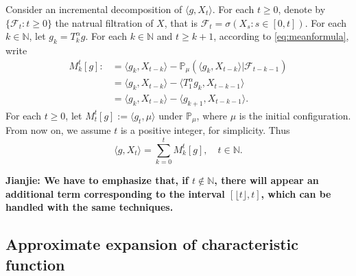 \documentclass[12pt, a4paper]{amsart}
\theoremstyle{definition}
\numberwithin{equation}{section}
\begin{document}
Consider an incremental decomposition of $\langle g,X_t \rangle$. 
    For each $t\geq 0$, denote by $\{\mathcal{F}_t:t\geq 0\}$ the natrual filtration of $X$, that is $\mathcal{F}_t=\sigma(X_s:s\in [0,t])$. 
    For each $k \in \mathbb{N}$, let $g_k=T^{\alpha}_k g$. 
    For each $k \in \mathbb N$ and $t\geq k+1$, according to \eqref{eq:meanformula}, write
\begin{align*}
    M_k^t[g]:&=\langle g_k, X_{t-k}\rangle-\mathbb{P}_{\mu}(\langle g_k,X_{t-k}\rangle|\mathcal{F}_{t-k-1})\\
    &=\langle g_k, X_{t-k}\rangle-\langle T_1^{\alpha}g_{k},X_{t-k-1}\rangle\\
    &=\langle g_k, X_{t-k}\rangle-\langle g_{k+1},X_{t-k-1}\rangle.
\end{align*}
    For each $t\geq 0$, let $M_t^t[g]:=\langle g_t,\mu\rangle$ under $\mathbb P_\mu$, where $\mu $ is the initial configuration. 
    From now on, we assume $t$ is a positive integer, for simplicity. Thus
\begin{equation}\label{decomposition}
    \langle g,X_t\rangle
    =\sum_{k=0}^{t}M_k^t[g]
    , \quad t \in \mathbb N.
\end{equation}

{\bf Jianjie: We have to emphasize that, if $t\notin \mathbb{N}$, there will appear an additional term corresponding to the interval $[\lfloor t \rfloor,t]$, which can be handled with the same techniques.
}
\subsection{Approximate expansion of characteristic function}
\end{document}
